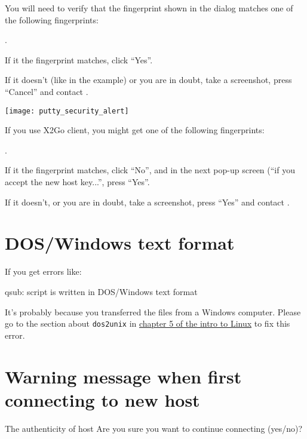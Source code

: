 You will need to verify that the fingerprint shown in the dialog matches one of the
following fingerprints:

\puttyFirstConnect

.

If it the fingerprint matches, click ``Yes''.

If it doesn't (like in the example) or you are in doubt, take a screenshot, press ``Cancel'' and contact \hpcinfo.

\sshedfingerprintnote

\texttt{[image: putty\_security\_alert]}

\ifugent
If you use X2Go client, you might get one of the following fingerprints:

\XTWOGoSHAONEFingerprints

.

If it the fingerprint matches, click ``No'', and in the next pop-up screen (``if you accept the new host key...'', press ``Yes''.

If it doesn't, or you are in doubt, take a screenshot, press ``Yes'' and contact \hpcinfo.
\fi 

\fi


\section{DOS/Windows text format}

If you get errors like:

\begin{prompt}
qsub:  script is written in DOS/Windows text format
\end{prompt}

It's probably because you transferred the files from a Windows computer.
Please go to the section about \lstinline|dos2unix| in \href{\LinuxManualURL#sec:dos2unix}{chapter 5 of the intro to Linux}
to fix this error.

\section{Warning message when first connecting to new host}
\label{sec:warning-message-new-host}

\ifmacORlinux
\begin{prompt}
The authenticity of host %
Are you sure you want to continue connecting (yes/no)?
\end{prompt}


